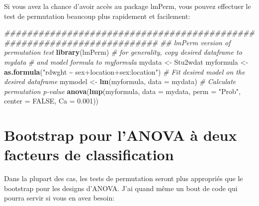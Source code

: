 \documentclass[
  12pt,
]{book}
\newenvironment{Shaded}{\begin{snugshade}}{\end{snugshade}}
\newcommand{\CommentTok}[1]{\textcolor[rgb]{0.56,0.35,0.01}{\textit{#1}}}
\newcommand{\DataTypeTok}[1]{\textcolor[rgb]{0.13,0.29,0.53}{#1}}
\newcommand{\FloatTok}[1]{\textcolor[rgb]{0.00,0.00,0.81}{#1}}
\newcommand{\KeywordTok}[1]{\textcolor[rgb]{0.13,0.29,0.53}{\textbf{#1}}}
\newcommand{\NormalTok}[1]{#1}
\newcommand{\OtherTok}[1]{\textcolor[rgb]{0.56,0.35,0.01}{#1}}
\newcommand{\StringTok}[1]{\textcolor[rgb]{0.31,0.60,0.02}{#1}}
\begin{document}
Si vous avez la chance d'avoir accès au package lmPerm, vous pouvez effectuer le test de permutation beaucoup plus rapidement et facilement:

\begin{Shaded}
\begin{Highlighting}[]
\CommentTok{\#\#\#\#\#\#\#\#\#\#\#\#\#\#\#\#\#\#\#\#\#\#\#\#\#\#\#\#\#\#\#\#\#\#\#\#\#\#\#\#\#\#\#\#\#\#\#\#\#\#\#\#\#\#\#\#\#\#\#\#\#\#\#\#\#\#\#\#\#\#\#}
\CommentTok{\#\# lmPerm version of permutation test}
\KeywordTok{library}\NormalTok{(lmPerm)}
\CommentTok{\# for generality, copy desired dataframe to mydata}
\CommentTok{\# and model formula to myformula}
\NormalTok{mydata \textless{}{-}}\StringTok{ }\NormalTok{Stu2wdat}
\NormalTok{myformula \textless{}{-}}\StringTok{ }\KeywordTok{as.formula}\NormalTok{(}\StringTok{"rdwght \textasciitilde{} sex+location+sex:location"}\NormalTok{)}
\CommentTok{\# Fit desired model on the desired dataframe}
\NormalTok{mymodel \textless{}{-}}\StringTok{ }\KeywordTok{lm}\NormalTok{(myformula, }\DataTypeTok{data =}\NormalTok{ mydata)}
\CommentTok{\# Calculate permutation p{-}value}
\KeywordTok{anova}\NormalTok{(}\KeywordTok{lmp}\NormalTok{(myformula, }\DataTypeTok{data =}\NormalTok{ mydata, }\DataTypeTok{perm =} \StringTok{"Prob"}\NormalTok{, }\DataTypeTok{center =} \OtherTok{FALSE}\NormalTok{, }\DataTypeTok{Ca =} \FloatTok{0.001}\NormalTok{))}
\end{Highlighting}
\end{Shaded}

\hypertarget{bootstrap-pour-lanova-uxe0-deux-facteurs-de-classification}{%
\section{Bootstrap pour l'ANOVA à deux facteurs de classification}\label{bootstrap-pour-lanova-uxe0-deux-facteurs-de-classification}}

Dans la plupart des cas, les tests de permutation seront plus appropriés que le bootstrap pour les designs d'ANOVA. J'ai quand même un bout de code qui pourra servir si vous en avez besoin:
\end{document}
